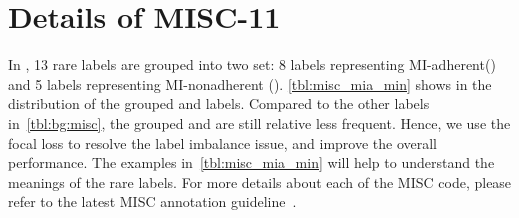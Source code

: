 \section{Details of MISC-11}
\label{sec:misc:our-clustering}
In , 13 rare labels are grouped into two set: 8 labels
representing MI-adherent(\MIA) and 5 labels representing
MI-nonadherent (\MIN). \autoref{tbl:misc_mia_min} shows in the
distribution of the grouped \MIA and \MIN labels. Compared to the
other labels in~\autoref{tbl:bg:misc}, the grouped \MIA and \MIN are
still relative less frequent. Hence, we use the focal loss to resolve
the label imbalance issue, and improve the overall performance. The
examples in~\autoref{tbl:misc_mia_min} will help to understand the
meanings of the rare labels. For more details about each of the MISC
code, please refer to the latest MISC annotation
guideline~\cite{houck2012motivational}.
